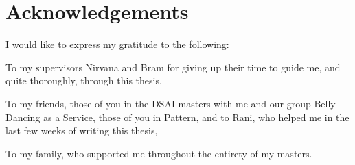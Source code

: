 \chapter*{Acknowledgements}\label{chapter:acknowledgements}

I would like to express my gratitude to the following:

To my supervisors Nirvana and Bram for giving up their time to guide me, and quite thoroughly, through this thesis,

To my friends, those of you in the DSAI masters with me and our group Belly Dancing as a Service, those of you in Pattern, and to Rani, who helped me in the last few weeks of writing this thesis,

To my family, who supported me throughout the entirety of my masters.
